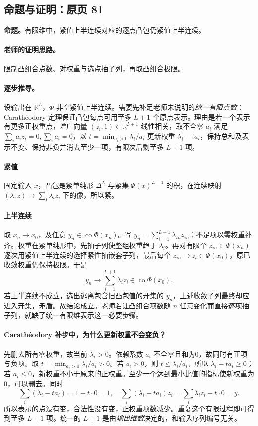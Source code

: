 \documentclass[11pt,a4paper]{article}
\newcommand{\R}{\mathbb{R}}\newcommand{\N}{\mathbb{N}}
\theoremstyle{definition}\newtheorem{definition}{定义}\newtheorem{example}{例}
\begin{document}
\subsection{命题与证明：原页 81}

\textbf{命题。}有限维中，紧值上半连续对应的逐点凸包仍紧值上半连续。

\paragraph{老师的证明思路。}限制凸组合点数、对权重与选点抽子列，再取凸组合极限。

\paragraph{逐步推导。}
设输出在 $\R^L$，$\Phi$ 非空紧值上半连续。需要先补足老师未说明的\emph{统一有限点数}：Carathéodory 定理保证凸包每点可用至多 $L+1$ 个原点表示。理由是若一个表示有更多正权重点，增广向量 $(z_i,1)\in\R^{L+1}$ 线性相关，取不全零 $a_i$ 满足 $\sum_i a_iz_i=0,\sum_i a_i=0$，以 $t=\min_{a_i>0}\lambda_i/a_i$ 更新权重 $\lambda_i-ta_i$，保持总和及表示不变、保持非负并消去至少一项，有限次后剩至多 $L+1$ 项。
\paragraph{紧值}固定输入 $x$，凸包是紧单纯形 $\Delta^L$ 与紧集 $\Phi(x)^{L+1}$ 的积，在连续映射 $(\lambda,z)\mapsto\sum_i\lambda_i z_i$ 下的像，所以紧。
\paragraph{上半连续}取 $x_n\to x_0$，及任意 $y_n\in\operatorname{co}\Phi(x_n)$。写 $y_n=\sum_{i=1}^{L+1}\lambda_{in}z_{in}$；不足项以零权重补齐。权重在紧单纯形中，先抽子列使整组权重趋于 $\lambda_i$。再对有限个 $z_{in}\in\Phi(x_n)$ 逐次用紧值上半连续的选择紧性抽嵌套子列，最后每个 $z_{in}\to z_i\in\Phi(x_0)$，原已收敛权重仍保持极限。于是
\[y_n\to\sum_{i=1}^{L+1}\lambda_i z_i\in\operatorname{co}\Phi(x_0).\]
若上半连续不成立，选出逃离包含旧凸包值的开集的 $y_n$，上述收敛子列最终却应进入开集，矛盾。故结论成立。老师若让凸组合项数随 $n$ 任意变化而直接逐项抽子列，就缺了统一有限维表示这一必要步骤。



\paragraph{Carathéodory 补步中，为什么更新权重不会变负？}
先删去所有零权重，故当前 $\lambda_i>0$。依赖系数 $a_i$ 不全零且和为0，故同时有正项与负项。取 $t=\min_{a_i>0}\lambda_i/a_i>0$。若 $a_i>0$，则 $t\le\lambda_i/a_i$，所以 $\lambda_i-ta_i\ge0$；若 $a_i\le0$，新权重不小于原来的正权重。至少一个达到最小比值的指标使新权重为0，可以删去。同时
\[\sum_i(\lambda_i-ta_i)=1-t\cdot0=1,
\quad \sum_i(\lambda_i-ta_i)z_i=\sum_i\lambda_i z_i-t\cdot0=y.
\]
所以表示的点没有变，合法性没有变，正权重项数减少。重复这个有限过程即可得到至多 $L+1$ 项。统一的 $L+1$ 是由\emph{输出维数}决定的，和输入序列编号无关。
\end{document}
